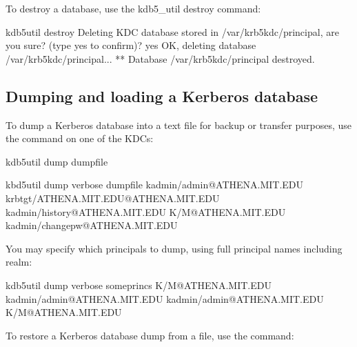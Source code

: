 \documentclass[letterpaper,10pt,english]{sphinxmanual}
\begin{document}
\sphinxAtStartPar
To destroy a database, use the kdb5\_util destroy command:

\begin{sphinxVerbatim}[commandchars=\\\{\}]
\PYGZdl{} kdb5\PYGZus{}util destroy
Deleting KDC database stored in \PYGZsq{}/var/krb5kdc/principal\PYGZsq{}, are you sure?
(type \PYGZsq{}yes\PYGZsq{} to confirm)? yes
OK, deleting database \PYGZsq{}/var/krb5kdc/principal\PYGZsq{}...
** Database \PYGZsq{}/var/krb5kdc/principal\PYGZsq{} destroyed.
\end{sphinxVerbatim}


\subsection{Dumping and loading a Kerberos database}
\label{\detokenize{admin/database:dumping-and-loading-a-kerberos-database}}\label{\detokenize{admin/database:restore-from-dump}}
\sphinxAtStartPar
To dump a Kerberos database into a text file for backup or transfer
purposes, use the {\hyperref[\detokenize{admin/admin_commands/kdb5_util:kdb5-util-8}]{}}  command on one of the
KDCs:

\begin{sphinxVerbatim}[commandchars=\\\{\}]
\PYGZdl{} kdb5\PYGZus{}util dump dumpfile

\PYGZdl{} kbd5\PYGZus{}util dump \PYGZhy{}verbose dumpfile
kadmin/admin@ATHENA.MIT.EDU
krbtgt/ATHENA.MIT.EDU@ATHENA.MIT.EDU
kadmin/history@ATHENA.MIT.EDU
K/M@ATHENA.MIT.EDU
kadmin/changepw@ATHENA.MIT.EDU
\end{sphinxVerbatim}

\sphinxAtStartPar
You may specify which principals to dump, using full principal names
including realm:

\begin{sphinxVerbatim}[commandchars=\\\{\}]
\PYGZdl{} kdb5\PYGZus{}util dump \PYGZhy{}verbose someprincs K/M@ATHENA.MIT.EDU kadmin/admin@ATHENA.MIT.EDU
kadmin/admin@ATHENA.MIT.EDU
K/M@ATHENA.MIT.EDU
\end{sphinxVerbatim}

\sphinxAtStartPar
To restore a Kerberos database dump from a file, use the
{\hyperref[\detokenize{admin/admin_commands/kdb5_util:kdb5-util-8}]{}}  command:
\end{document}

